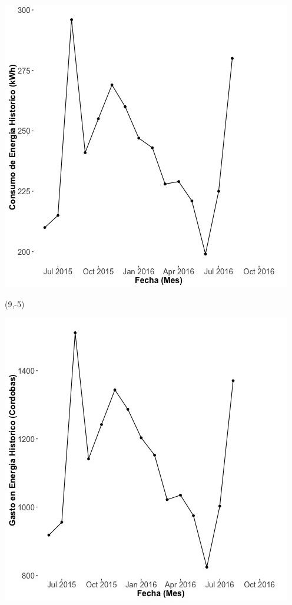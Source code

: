\documentclass{article}\usepackage[]{graphicx}\usepackage[]{color}
\newenvironment{knitrout}{}{} %
\begin{document}
\begin{knitrout}
\color{fgcolor}
\includegraphics[scale=0.65]{figure/A3_historico_energia} 
\end{knitrout}

 \begin{textblock}{1}(9,-5)
\begin{minipage}{20em}
\begingroup

\endgroup
\end{minipage}
\end{textblock}

\begin{knitrout}
\color{fgcolor}
\includegraphics[scale=0.65]{figure/A3_historico_cordobas} 
\end{knitrout}
\end{document}
